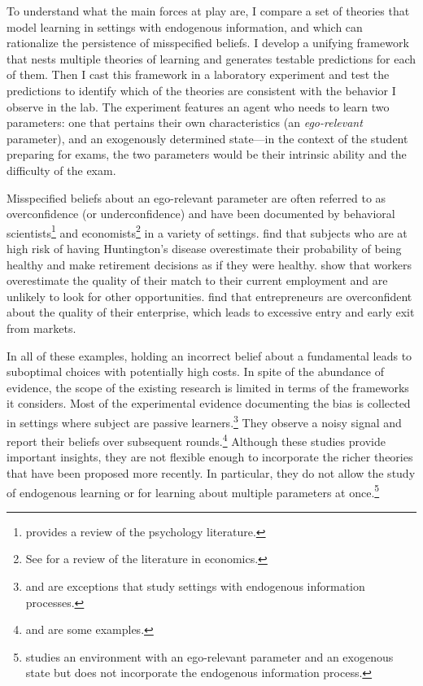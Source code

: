 \documentclass[
  12pt,
]{article}
\begin{document}
To understand what the main forces at play are, I compare a set of
theories that model learning in settings with endogenous information,
and which can rationalize the persistence of misspecified beliefs. I
develop a unifying framework that nests multiple theories of learning
and generates testable predictions for each of them. Then I cast this
framework in a laboratory experiment and test the predictions to
identify which of the theories are consistent with the behavior I
observe in the lab. The experiment features an agent who needs to learn
two parameters: one that pertains their own characteristics (an
\emph{ego-relevant} parameter), and an exogenously determined state---in
the context of the student preparing for exams, the two parameters would
be their intrinsic ability and the difficulty of the exam.

Misspecified beliefs about an ego-relevant parameter are often referred
to as overconfidence (or underconfidence) and have been documented by
behavioral scientists\footnote{\citet{kelley1980} 
provides a review of the psychology literature.} and
economists\footnote{See \citet{benjamin2019} 
for a review of the literature in economics.} in a variety of settings.
\citet{Oster2013} find that subjects who are at high risk of having
Huntington's disease overestimate their probability of being healthy and
make retirement decisions as if they were healthy. \citet{Hoffman2020}
show that workers overestimate the quality of their match to their
current employment and are unlikely to look for other opportunities.
\citet{Camerer1999} find that entrepreneurs are overconfident about the
quality of their enterprise, which leads to excessive entry and early
exit from markets.

In all of these examples, holding an incorrect belief about a
fundamental leads to suboptimal choices with potentially high costs. In
spite of the abundance of evidence, the scope of the existing research
is limited in terms of the frameworks it considers. Most of the
experimental evidence documenting the bias is collected in settings
where subject are passive learners.\footnote{
\citet{Gotte2022} and \citet{Ozyilmaz2022} are exceptions that study settings with endogenous information processes.}
They observe a noisy signal and report their beliefs over subsequent
rounds.\footnote{\citet{Bracha2012} and 
\citet{Mobius2022} are some examples.} Although these studies provide
important insights, they are not flexible enough to incorporate the
richer theories that have been proposed more recently. In particular,
they do not allow the study of endogenous learning or for learning about
multiple parameters at once.\footnote{\citet{Coutts2020} 
studies an environment with an ego-relevant parameter and an exogenous state but does not 
incorporate the endogenous information process.}
\end{document}
